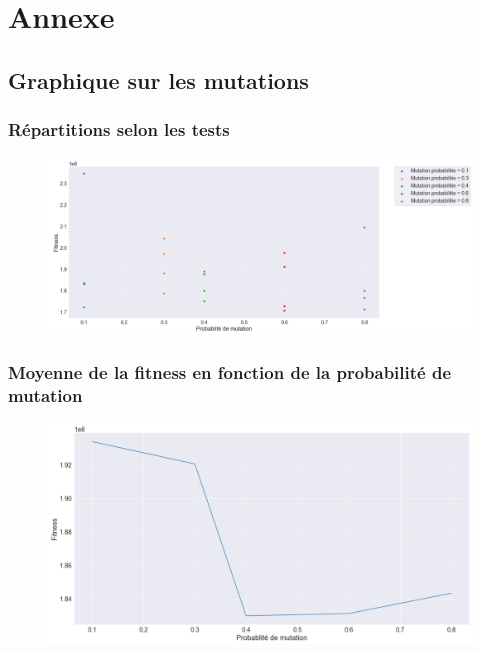 \documentclass{article} %
\begin{document}
\section{Annexe}
\subsection{Graphique sur les mutations}
\subsubsection{Répartitions selon les tests}
\begin{figure}[!h]
	\centering
	\includegraphics[keepaspectratio = true,scale=0.65]{mutation_test.png}
\end{figure}
\subsubsection{Moyenne de la fitness en fonction de la probabilité de mutation}
\begin{figure}[!h]
	\centering
	\includegraphics[keepaspectratio = true,scale=0.65]{mutation_mean.png}
\end{figure}
\imtaMakeCover
\end{document}
